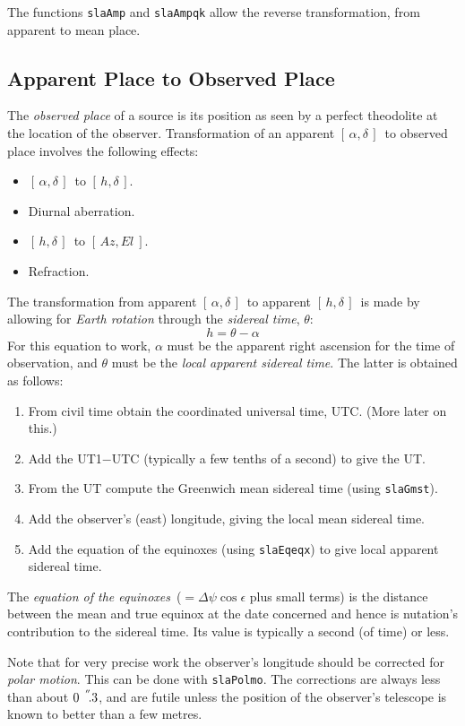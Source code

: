 \documentclass[11pt,fleqn,twoside]{article}
\renewcommand{\_}{{\tt\char'137}}     %
\newcommand{\radec}     {$[\,\alpha,\delta\,]$}
\newcommand{\hadec}     {$[\,h,\delta\,]$}
\newcommand{\azel}      {$[\,Az,El~]$}
\newcommand{\arcseci}[1] {$#1\hspace{0.05em}$\raisebox{-0.5ex}
                         {$^{'\hspace{-0.1em}'\hspace{0.0em}}$}}
\newcommand{\arcsec}[2] {\arcseci{#1}$\hspace{-0.35em}.#2$}
\begin{document}
The functions
{\tt slaAmp}
and
{\tt slaAmpqk}
allow the reverse transformation, from apparent to mean place.

\subsection{Apparent Place to Observed Place}
The {\it observed place}\/ of a source is its position as
seen by a perfect theodolite at the location of the
observer.  Transformation of an apparent \radec\ to observed
place involves the following effects:
\goodbreak
\begin{itemize}
   \item \radec\ to \hadec.
   \item Diurnal aberration.
   \item \hadec\ to \azel.
   \item Refraction.
\end{itemize}
The transformation from apparent \radec\ to
apparent \hadec\ is made by allowing for
{\it Earth rotation}\/ through the {\it sidereal time}, $\theta$:
\[ h = \theta - \alpha \]
For this equation to work, $\alpha$ must be the apparent right
ascension for the time of observation, and $\theta$ must be
the {\it local apparent sidereal time}.  The latter is obtained
as follows:
\begin{enumerate}
\item From civil time obtain the coordinated universal time, UTC.
      (More later on this.)
\item Add the UT1$-$UTC (typically a few tenths of a second) to
      give the UT.
\item From the UT compute the Greenwich mean sidereal time (using
{\tt slaGmst}).
\item Add the observer's (east) longitude, giving the local mean
      sidereal time.
\item Add the equation of the equinoxes (using
{\tt slaEqeqx}) to give local apparent sidereal time.
\end{enumerate}
The {\it equation of the equinoxes}\/~($=\Delta\psi\cos\epsilon$ plus
small terms) is the distance between the mean and true equinox
at the date concerned and hence is
nutation's contribution to the sidereal time.
Its value is typically a second (of time) or less.

Note that for very precise work the observer's longitude should
be corrected for {\it polar motion}.  This can be done with
{\tt slaPolmo}.
The corrections are always less than about \arcsec{0}{3}, and
are futile unless the position of the observer's telescope is known
to better than a few metres.
 
\end{document}
